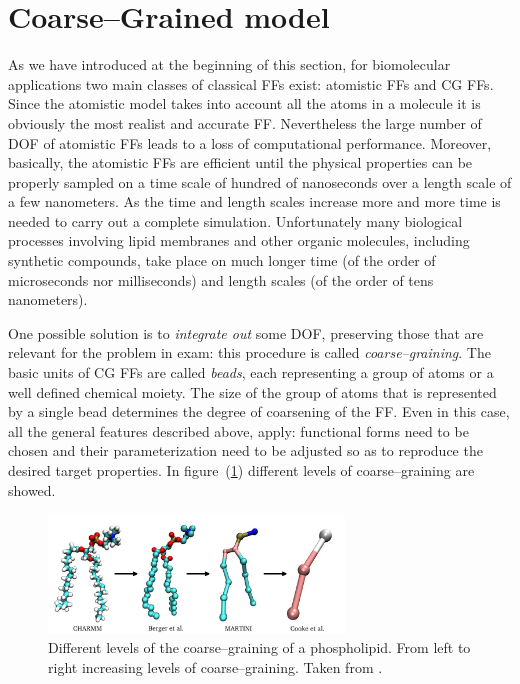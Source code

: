 \section{Coarse--Grained model}
\label{sec:CGModel}
As we have introduced at the beginning of this section, for biomolecular applications two main classes of
classical \acp{FF} exist: atomistic \acp{FF} and \ac{CG} \acp{FF}. Since the atomistic model takes into account
all the atoms in a molecule it is obviously the most realist and accurate \ac{FF}. Nevertheless the large number
of \ac{DOF} of atomistic \acp{FF} leads to a loss of computational performance. Moreover, basically, the
atomistic \acp{FF} are efficient until the physical properties can be properly sampled on a time scale of 
hundred of nanoseconds over a length scale of a few nanometers. As the time and length scales increase more and 
more time is needed to carry out a complete simulation. Unfortunately many biological processes involving lipid 
membranes and other organic molecules, including synthetic compounds, take place on much longer time (of the 
order of microseconds nor milliseconds) and length scales (of the order of tens nanometers).

One possible solution is to \textit{integrate out} some \ac{DOF}, preserving those that are relevant for the
problem in exam: this procedure is called \textit{coarse--graining}. The basic units of \ac{CG} \acp{FF} are
called \textit{beads}, each representing a group of atoms or a well defined chemical moiety. The size of the
group of atoms that is represented by a single bead determines the degree of coarsening of the \ac{FF}. Even in
this case, all the general features described above, apply: functional forms need to be chosen and their
parameterization need to be adjusted so as to reproduce the desired target properties. In figure~(\ref{fig:CGLevels}) different levels of coarse--graining are showed.
\begin{figure}[h!t]
	\centering
	\includegraphics[width=0.7\textwidth]{./img/CGMapping}
	\caption{Different levels of the coarse--graining of a phospholipid. From left to right increasing levels of coarse--graining. Taken from \cite{CoarseGrainingMapping}.}
	\label{fig:CGLevels}
\end{figure}


